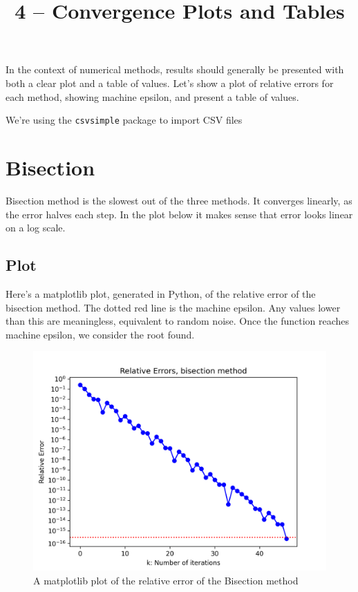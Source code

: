 \documentclass{article}
\title{4 -- Convergence Plots and Tables}
\begin{document}
\maketitle

In the context of numerical methods, results should generally be presented
with both a clear plot and a table of values. Let's show a plot of relative
errors for each method, showing machine epsilon, and present a table of values.

We're using the \texttt{csvsimple} package to import CSV files

\section{Bisection}

Bisection method is the slowest out of the three methods. It converges
linearly, as the error halves each step. In the plot below it makes sense
that error looks linear on a log scale.

\subsection{Plot}

Here's a matplotlib plot, generated in Python, of the relative error of the
bisection method. The dotted red line is the machine epsilon. Any values lower
than this are meaningless, equivalent to random noise. Once the function
reaches machine epsilon, we consider the root found.

\begin{figure}
    \centering
    \includegraphics[scale=0.7]{./plots/bisectionrel.png}
    \caption {A matplotlib plot of the relative error of the Bisection method}
\end{figure}
\end{document}
